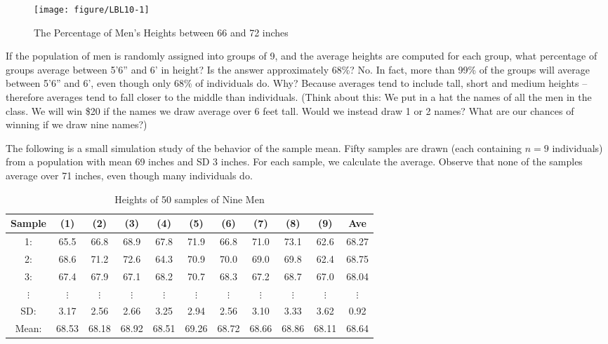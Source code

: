 \documentclass[11pt]{book}\usepackage[]{graphicx}\usepackage[]{color}
\begin{document}
\begin{figure}[ht]
\caption{The Percentage of Men's Heights between 66 and 72 inches}



{\centering \texttt{[image: figure/LBL10-1]} 

}




\end{figure}

If the population of men is randomly assigned into groups of 9, and the average heights are computed for each group, what percentage of groups average between 5'6'' and 6' in height?    Is the answer approximately 68\%?  No.  In fact, more than 99\% of the groups will average between 5'6'' and 6', even though only 68\% of individuals do.  Why?  Because averages tend to include tall, short and medium heights -- therefore averages tend to fall closer to the middle than individuals.   (Think about this:  We put in a hat the names of all the men in the class.  We will win \$20 if the names we draw average over 6 feet tall.  Would we instead draw 1 or 2 names?  What are our chances of winning if we draw nine names?)  

The following is a small simulation study of the behavior of the sample mean.  Fifty samples are drawn (each containing $n = 9$ individuals) from a population with mean 69 inches and SD 3 inches.  For each sample, we calculate the average.  Observe that none of the samples average over 71 inches, even though many individuals do.

\begin{table}[ht]
\caption{Heights of 50 samples of Nine Men}
\begin{tabular}{@{} ccccccccccc @{}} \hline
Sample & (1)&(2)&(3)&(4)&(5)&(6)&(7)&(8)&(9)& Ave \\ \hline
1: &65.5&66.8&68.9&67.8&71.9&66.8&71.0&73.1&62.6&68.27 \\
2: &68.6&71.2&72.6&64.3&70.9&70.0&69.0&69.8&62.4&68.75 \\
3: &67.4&67.9&67.1&68.2&70.7&68.3&67.2&68.7&67.0&68.04 \\
$\vdots$ & $\vdots$ & $\vdots$ & $\vdots$ & $\vdots$ & $\vdots$ & $\vdots$ & $\vdots$ & $\vdots$ & $\vdots$ & $\vdots$ \\ \hline
SD: &3.17&2.56&2.66&3.25&2.94&2.56&3.10&3.33&3.62 & 0.92 \\
Mean: &68.53&68.18&68.92&68.51&69.26&68.72&68.66&68.86&68.11& 68.64 \\ \hline
\end{tabular}
\end{table}
\end{document}

